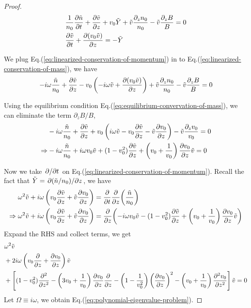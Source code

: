 \documentclass{article}
\theoremstyle{plain}
\theoremstyle{definition}
\theoremstyle{remark}
\theoremstyle{remark}
\begin{document}
\begin{proof}
    \begin{align*}
        &\frac{1}{n_0}\pdv{\tilde{n}}{t} 
        + \pdv{\tilde{v}}{z} + v_0\tilde{Y} + \tilde{v}\frac{\partial_z n_0}{n_0} - \tilde{v}\frac{\partial_z B}{B} = 0 
        \\
        &\pdv{\tilde{v}}{t} + \pdv{(v_0\tilde{v})}{z} = -\tilde{Y}
    \end{align*}


    We plug Eq.(\ref{eq:linearized-conservation-of-momentum}) in to Eq.(\ref{eq:linearized-conservation-of-mass}), we have 
    \[ -i\omega\frac{\tilde{n}}{n_0} 
    + \pdv{\tilde{v}}{z} - v_0\left(-i\omega\tilde{v} + \pdv{(v_0\tilde{v})}{z}\right) + \tilde{v}\frac{\partial_z n_0}{n_0} - \tilde{v}\frac{\partial_z B}{B} = 0 \]

    Using the equilibrium condition Eq.(\ref{eq:equilibrium-convervation-of-mass}), we can eliminate the term $\partial_z B/B$,
    \begin{align*}
    &-i\omega\frac{\tilde{n}}{n_0} 
    + \pdv{\tilde{v}}{z} 
    + v_0\left(i\omega \tilde{v} - v_0\pdv{\tilde{v}}{z} - \tilde{v}\pdv{v_0}{z} \right)
    - \tilde{v}\frac{\partial_z v_0}{v_0} = 0\\
    \Rightarrow
    &-i\omega\frac{\tilde{n}}{n_0} 
    + i\omega v_0\tilde{v}
    + (1-v_0^2)\pdv{\tilde{v}}{z} 
    + \left(v_0+\frac{1}{v_0}\right)\pdv{v_0}{z}\tilde{v} = 0
    \end{align*}

    Now we take $\pdv*{t}$ on Eq.(\ref{eq:linearized-conservation-of-momentum}). Recall the fact that $\tilde{Y} = \pdv*{(\tilde{n}/n_0)}{z}$, we have
    \begin{align*}
        \omega^2\tilde{v} + i\omega\left(v_0\pdv{\tilde{v}}{z} + \tilde{v}\pdv{v_0}{z}\right) &= \pdv{t}\pdv{z}(\frac{\tilde{n}}{n_0}) \\
        \Rightarrow
        \omega^2\tilde{v} + i\omega\left(v_0\pdv{\tilde{v}}{z} + \tilde{v}\pdv{v_0}{z}\right) &= \pdv{z}(-i\omega v_0\tilde{v}
        - (1-v_0^2)\pdv{\tilde{v}}{z} 
        + \left(v_0+\frac{1}{v_0}\right)\pdv{v_0}{z}\tilde{v})
    \end{align*}
    Expand the RHS and collect terms, we get
    \begin{align*}
        &\omega^2 \tilde{v} \\ 
        &+2i\omega\left(v_0\pdv{}{z} + \pdv{v_0}{z}\right) \tilde{v} \\ 
        &+\left[ (1-v_0^2)\pdv[2]{}{z} 
        -\left(3v_0 + \frac{1}{v_0}\right)\pdv{v_0}{z}\pdv{}{z} 
        - \left(1-\frac{1}{v_0^2}\right)\left(\pdv{v_0}{z}\right)^2 
        - \left(v_0+\frac{1}{v_0}\right)\pdv[2]{v_0}{z} \right]\tilde{v}
        = 0
    \end{align*}
    Let $\Omega \equiv i\omega$, we obtain Eq.(\ref{eq:polynomial-eigenvalue-problem}).
\end{proof}
\end{document}
